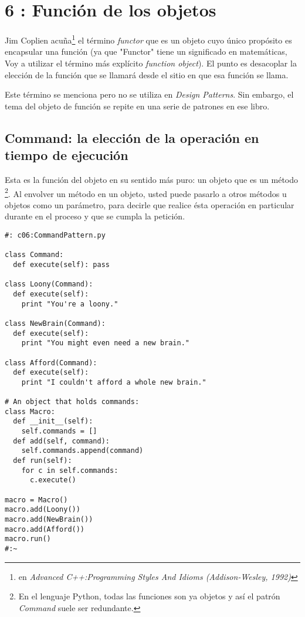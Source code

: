 \section*{6 : Función de los objetos}
\label{sec:fdlo}


Jim Coplien acuña\footnote{en \textit{Advanced C++:Programming Styles And Idioms (Addison-Wesley, 1992)}} el término \textit{functor} que es un objeto cuyo único propósito es encapsular una función (ya que "Functor" tiene un significado en matemáticas, Voy a utilizar el término más explícito  \textit{function object}). El punto es desacoplar la elección de la función que se llamará desde el sitio en que esa función se llama.   \newline

Este término se menciona pero no se utiliza en \textit{Design Patterns}. Sin embargo, el tema del objeto de función se repite en una serie de patrones en ese libro.    \newline

\subsection*{Command: la elección de la operación en tiempo de ejecución}
\label{subsec:cledloetde}


Esta es la función del objeto en su sentido más puro: un objeto que es un método \footnote{En el lenguaje Python, todas las funciones son ya objetos y así el patrón \textit{Command} suele ser redundante.}. Al envolver un método en un objeto, usted puede pasarlo a otros métodos u objetos como un parámetro, para decirle que realice ésta operación en particular durante en el proceso y que se cumpla la petición.     \newline

\begin{lstlisting}
#: c06:CommandPattern.py 

class Command: 
  def execute(self): pass 
  
class Loony(Command): 
  def execute(self): 
    print "You're a loony." 
    
class NewBrain(Command): 
  def execute(self): 
    print "You might even need a new brain." 
    
class Afford(Command): 
  def execute(self): 
    print "I couldn't afford a whole new brain."
    
# An object that holds commands: 
class Macro: 
  def __init__(self): 
    self.commands = [] 
  def add(self, command):  
    self.commands.append(command)  
  def run(self): 
    for c in self.commands: 
      c.execute() 
      
macro = Macro() 
macro.add(Loony()) 
macro.add(NewBrain()) 
macro.add(Afford()) 
macro.run() 
#:~       
\end{lstlisting}

